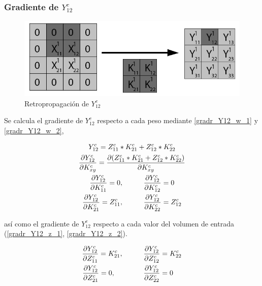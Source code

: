 \subsubsection{Gradiente de $Y^c_{12}$}

\begin{figure}[H]
	\centering
	\includegraphics[width=0.8\linewidth]{imagenes/conv_back_padding_2.jpg} 
	\caption{Retropropagación de $Y^c_{12}$}
\end{figure}

Se calcula el gradiente de $Y^c_{12}$ respecto a cada peso mediante \ref{gradr_Y12_w_1} y \ref{gradr_Y12_w_2},

\begin{gather}
	Y^c_{12} = Z^c_{11} * K^c_{21} + Z^c_{12} * K^c_{22} \\
	\frac{\partial Y^c_{12}}{\partial K^c_{xy}} = \frac{\partial (Z^c_{11} * K^c_{21} + Z^c_{12} * K^c_{22})}{\partial K^c_{xy}} \\
	\frac{\partial Y^c_{12}}{\partial K^c_{11}} = 0, \hspace{10mm} \frac{\partial Y^c_{12}}{\partial K^c_{12}} = 0 \label{gradr_Y12_w_1} \\
	\frac{\partial Y^c_{12}}{\partial K^c_{21}} = Z^c_{11}, \hspace{10mm} \frac{\partial Y^c_{12}}{\partial K^c_{22}} = Z^c_{12} \label{gradr_Y12_w_2}
\end{gather}

así como el gradiente de $Y^c_{12}$ respecto a cada valor del volumen de entrada (\ref{gradr_Y12_z_1}, \ref{gradr_Y12_z_2}).

\begin{gather}
	\frac{\partial Y^c_{12}}{\partial Z^c_{11}} = K^c_{21}, \hspace{10mm} \frac{\partial Y^c_{12}}{\partial Z^c_{12}} = K^c_{22} \label{gradr_Y12_z_1} \\
	\frac{\partial Y^c_{12}}{\partial Z^c_{21}} = 0, \hspace{14mm} \frac{\partial Y^c_{12}}{\partial Z^c_{22}} = 0 \hspace{4mm} \label{gradr_Y12_z_2}
\end{gather}

